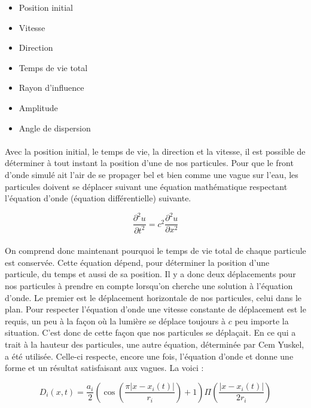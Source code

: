 \documentclass[a4paper, 12pt]{article} %
\begin{document}
	\begin{itemize}
	    \item Position initial
	    \item Vitesse
	    \item Direction
	    \item Temps de vie total
	    \item Rayon d'influence
	    \item Amplitude
	    \item Angle de dispersion
	\end{itemize}

	\paragraph{}
	Avec la position initial, le temps de vie, la direction et la vitesse, il est possible de 
	déterminer à tout instant la position d'une de nos particules. Pour que le front d'onde simulé
	ait l'air de se propager bel et bien comme une vague sur l'eau, les particules doivent se déplacer
	suivant une équation mathématique respectant l'équation d'onde (équation différentielle) suivante.

	\begin{equation}
	    \frac{\partial^{2}u}{\partial t^{2}} = c^{2} \frac {\partial^{2}u} {\partial x^{2}}
	\end{equation}

	\paragraph{}
	On comprend donc maintenant pourquoi le temps de vie total de chaque particule est conservée.
	Cette équation dépend, pour déterminer la position d'une particule, du temps et aussi de sa position.
	Il y a donc deux déplacements pour nos particules à prendre en compte lorsqu'on cherche une solution à
	l'équation d'onde. Le premier est le déplacement horizontale de nos particules, celui dans le plan.
	Pour respecter l'équation d'onde une vitesse constante de déplacement est le requis, un peu à la façon
	où la lumière se déplace toujours à $c$ peu importe la situation. C'est donc de cette façon que nos particules
	se déplaçait. En ce qui a trait à la hauteur des particules, une autre équation, déterminée par Cem Yuskel,
	a été utilisée. Celle-ci respecte, encore une fois, l'équation d'onde et donne une forme et un résultat satisfaisant
	aux vagues. La voici :

	\begin{equation}
	    D_{i}(x, t) = \frac{a_{i}}{2} \left( \cos\left( \frac{\pi |x - x_{i}(t)|}{r_{i}}\right) + 1\right)
	    \Pi \left( \frac{|x - x_{i}(t)|} {2 r_{i}}\right)
	\end{equation}
\end{document}
